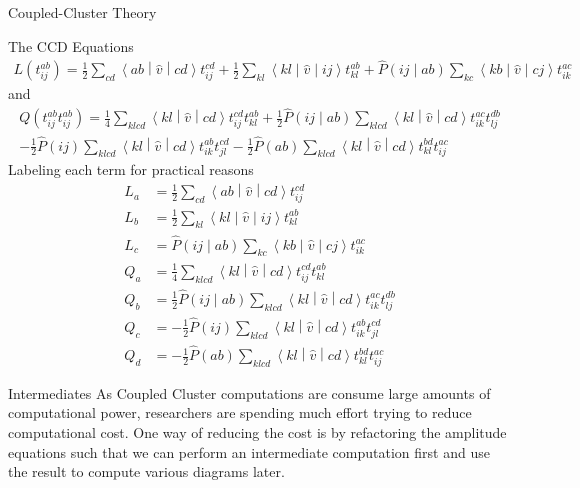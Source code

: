 \documentclass[twoside,english]{uiofysmaster}
\begin{document}
\begin{chapter}{Coupled-Cluster Theory}
\begin{section}{The CCD Equations}
  		\begin{align}
  			L(t_{ij}^{ab}) = \frac{1}{2} \sum_{cd}\left<ab\middle|\hat v\middle|cd\right>t_{ij}^{cd} + \frac{1}{2} \sum_{kl} \left<kl\middle|\hat v\middle|ij\right>t_{kl}^{ab} + \hat P\left(ij\middle|ab\right) \sum_{kc}\left<kb\middle|\hat v\middle|cj\right>t_{ik}^{ac}
  		\end{align}
  		and 
  		\begin{align}
  			Q(t_{ij}^{ab}t_{ij}^{ab}) = \frac{1}{4} \sum_{klcd}\left<kl\middle|\hat v\middle|cd\right>t_{ij}^{cd} t_{kl}^{ab} + \frac{1}{2} \hat P\left(ij\middle|ab\right) \sum_{klcd}\left<kl\middle|\hat v\middle|cd\right>t_{ik}^{ac} t_{lj}^{db} \\
  			- \frac{1}{2}\hat P(ij) \sum_{klcd}\left<kl\middle|\hat v\middle|cd\right>t_{ik}^{ab} t_{jl}^{cd} - \frac{1}{2}\hat P(ab) \sum_{klcd}\left<kl\middle|\hat v\middle|cd\right>t_{kl}^{bd} t_{ij}^{ac}
  		\end{align}
  		Labeling each term for practical reasons	
  		\begin{align}
  			L_a &= \frac{1}{2} \sum_{cd}\left<ab\middle|\hat v\middle|cd\right>t_{ij}^{cd} \\
  			L_b &= \frac{1}{2} \sum_{kl} \left<kl\middle|\hat v\middle|ij\right>t_{kl}^{ab} \\
  			L_c &= \hat P\left(ij\middle|ab\right) \sum_{kc}\left<kb\middle|\hat v\middle|cj\right>t_{ik}^{ac} \\
  			Q_a &= \frac{1}{4} \sum_{klcd}\left<kl\middle|\hat v\middle|cd\right>t_{ij}^{cd} t_{kl}^{ab} \\
  			Q_b &= \frac{1}{2} \hat P\left(ij\middle|ab\right) \sum_{klcd}\left<kl\middle|\hat v\middle|cd\right>t_{ik}^{ac} t_{lj}^{db} \\
  			Q_c &= - \frac{1}{2}\hat P(ij) \sum_{klcd}\left<kl\middle|\hat v\middle|cd\right>t_{ik}^{ab} t_{jl}^{cd} \\
  			Q_d &= - \frac{1}{2}\hat P(ab) \sum_{klcd}\left<kl\middle|\hat v\middle|cd\right>t_{kl}^{bd} t_{ij}^{ac}
  		\end{align}
   	\end{section}

  	\begin{section}{Intermediates}
  		As Coupled Cluster computations are consume large amounts of computational power, researchers are spending much effort trying to reduce computational cost. One way of reducing the cost is by refactoring the amplitude equations such that we can perform an intermediate computation first and use the result to compute various diagrams later. 


\end{section}
\end{chapter}
\end{document}
